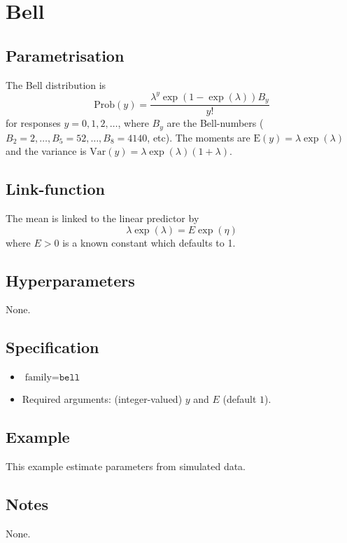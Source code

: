 \documentclass[a4paper,11pt]{article}
\begin{document}
\section*{Bell}

\subsection*{Parametrisation}

The Bell distribution is
\begin{displaymath}
    \text{Prob}(y) = \frac{\lambda^{y} \exp(1-\exp(\lambda)) B_y}{y!}
\end{displaymath}
for responses $y=0, 1, 2, \ldots$, where $B_y$ are the Bell-numbers
($B_2=2, \ldots,  B_5=52, \ldots, B_8=4140$, etc). The moments are
$\text{E}(y)=\lambda\exp(\lambda)$ and the variance is
$\text{Var}(y)=\lambda\exp(\lambda)(1+\lambda)$.



\subsection*{Link-function}

The mean is linked to the linear predictor by
\begin{displaymath}
    \lambda\exp(\lambda) = E \exp(\eta)
\end{displaymath}
where $E>0$ is a known constant which defaults to 1.

\subsection*{Hyperparameters}
None.

\subsection*{Specification}

\begin{itemize}
\item $\text{family}=\texttt{bell}$
\item Required arguments: (integer-valued) $y$ and $E$ (default $1$).
\end{itemize}


\subsection*{Example}

This example estimate parameters from simulated data.
{\small}

\subsection*{Notes}

None.
\end{document}
